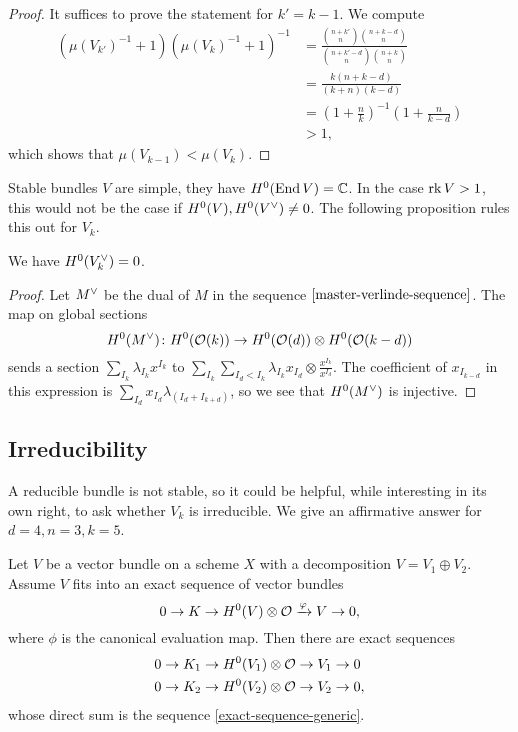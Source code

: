 \begin{proof}
	It suffices to prove the statement for $k'=k-1$. We compute
	\begin{align*}
		(\mu(V_{k'})^{-1}+1)(\mu(V_{k})^{-1}+1)^{-1}
		&= \frac{\binom{n+k'}{n}\binom{n+k-d}{n}}
		{\binom{n+k'-d}{n}\binom{n+k}{n}}
		\\ &= \frac{k(n+k-d)}{(k+n)(k-d)}
		\\ &= \left(1+\frac{n}{k}\right)^{-1}
		\left(1+\frac{n}{k-d}\right)
		\\ &> 1,
	\end{align*}
	which shows that $\mu(V_{k-1}) < \mu(V_{k})$.
\end{proof}

Stable bundles $V$ are simple, \ie they have $H^0(\operatorname{End}{V})=\mathbb{C}$. In the case $\operatorname{rk} V > 1$, this would not be the case if
$H^0(V),H^0(V^\vee) \neq 0$. The following proposition rules this out for $V_k$.

\begin{proposition}
	We have $H^{0}(V^\vee_k) = 0$.
\end{proposition}
\begin{proof}
	Let $M^\vee$ be the dual of $M$ in the sequence $\cref{master-verlinde-sequence}$. The map on global sections
	\[
		H^0(M^\vee)\colon
		H^0(\mathcal{O}(k))
		\to
		H^0(\mathcal{O}(d))\otimes H^0(\mathcal{O}(k-d))
	\]
	sends a section $\sum_{I_k} \lambda_{I_k} x^{I_k}$ to
	$\sum_{I_k} \sum_{I_d < I_k} \lambda_{I_k} x_{I_d} \otimes \frac{x^{I_k}}{x^{I_d}}$. The coefficient of $x_{I_{k-d}}$ in this expression is
	$\sum_{I_d} x_{I_d}\lambda_{(I_d+I_{k+d})}$, so we see that
	$H^0(M^\vee)$ is injective.
\end{proof}

\subsection{Irreducibility}

A reducible bundle is not stable, so it could be helpful, while interesting in its own right, to ask whether $V_k$ is irreducible. We give an affirmative answer for $d=4, n=3, k=5$.

\begin{lemma} \label{splitting-propagates}
	Let $V$ be a vector bundle on a scheme $X$ with a decomposition $V=V_1\oplus V_2$. Assume $V$ fits into an exact sequence of vector bundles
	\begin{equation} \label{exact-sequence-generic}
		0\to{K}\to {H^0(V)\otimes \mathcal{O}}\xrightarrow{\varphi}{V}\to 0,
	\end{equation}
	where $\phi$ is the canonical evaluation map.
	Then there are exact sequences
	\begin{align*}
		0 \to K_1 \to H^0(V_1)\otimes \mathcal{O} \to V_1 \to 0& \\
		0 \to K_2 \to H^0(V_2)\otimes \mathcal{O} \to V_2 \to 0&,
	\end{align*}
	whose direct sum is the sequence
	\cref{exact-sequence-generic}.
\end{lemma}

